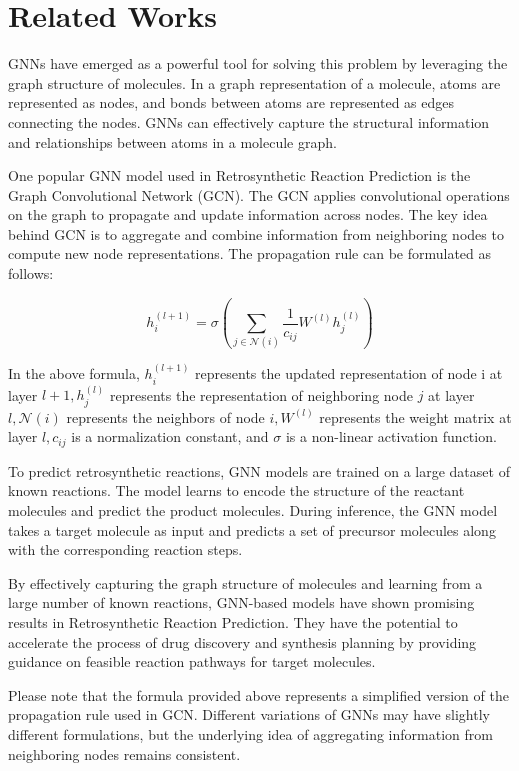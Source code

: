 \documentclass{article}
\begin{document}
\section{Related Works}

GNNs have emerged as a powerful tool for solving this problem by leveraging the graph structure of molecules. In a graph representation of a molecule, atoms are represented as nodes, and bonds between atoms are represented as edges connecting the nodes. GNNs can effectively capture the structural information and relationships between atoms in a molecule graph.

One popular GNN model used in Retrosynthetic Reaction Prediction is the Graph Convolutional Network (GCN). The GCN applies convolutional operations on the graph to propagate and update information across nodes. The key idea behind GCN is to aggregate and combine information from neighboring nodes to compute new node representations. The propagation rule can be formulated as follows:

\begin{equation}
  h_i^{(l+1)} = \sigma\left(\sum_{j\in \mathcal{N}(i)}\frac{1}{c_{ij}}W^{(l)}h_j^{(l)}\right)
\end{equation}

In the above formula, $h_i^{(l+1)}$ represents the updated representation of node i at layer $l+1, h_j^{(l)}$ represents the representation of neighboring node $j $ at layer $l, \mathcal{N}(i)$ represents the neighbors of node $i, W^{(l)}$ represents the weight matrix at layer $l, c_{ij}$ is a normalization constant, and $\sigma$ is a non-linear activation function.

To predict retrosynthetic reactions, GNN models are trained on a large dataset of known reactions. The model learns to encode the structure of the reactant molecules and predict the product molecules. During inference, the GNN model takes a target molecule as input and predicts a set of precursor molecules along with the corresponding reaction steps.

By effectively capturing the graph structure of molecules and learning from a large number of known reactions, GNN-based models have shown promising results in Retrosynthetic Reaction Prediction. They have the potential to accelerate the process of drug discovery and synthesis planning by providing guidance on feasible reaction pathways for target molecules.

Please note that the formula provided above represents a simplified version of the propagation rule used in GCN. Different variations of GNNs may have slightly different formulations, but the underlying idea of aggregating information from neighboring nodes remains consistent.
\end{document}
